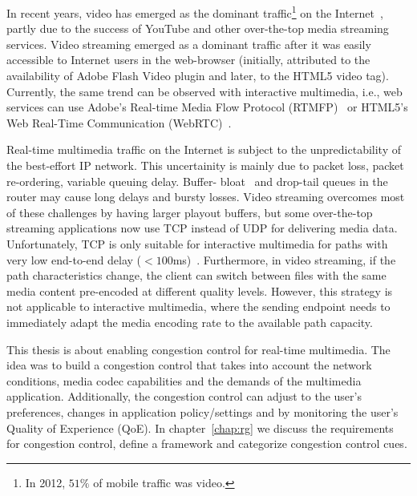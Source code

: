 In recent years, video has emerged as the dominant traffic\footnote{In 2012,
$51\%$ of mobile traffic was video.} on the Internet~\cite{cvni.13,dawn.zb},
partly due to the success of YouTube and other over-the-top media streaming
services. Video streaming emerged as a dominant traffic after it was easily
accessible to Internet users in the web-browser (initially, attributed to the
availability of Adobe Flash Video plugin and later, to the HTML5 video tag).
Currently, the same trend can be observed with interactive multimedia, i.e.,
web services can use Adobe's Real-time Media Flow Protocol
(RTMFP)~\cite{draft.rtmfp} or HTML5's Web Real-Time Communication
(WebRTC)~\cite{draft.webrtc}.

Real-time multimedia traffic on the Internet is subject to the
unpredictability of the best-effort IP network. This uncertainity is mainly
due to packet loss, packet re-ordering, variable queuing delay. Buffer-
bloat~\cite{gettys:bufferbloat} and drop-tail queues in the router may cause
long delays and bursty losses. Video streaming overcomes most of these
challenges by having larger playout buffers, but some over-the-top streaming
applications now use TCP instead of UDP for delivering media data.
Unfortunately, TCP is only suitable for interactive multimedia for paths with
very low end-to-end delay ($<100$ms)~\cite{Brosh:tcp-real-time}. Furthermore,
in video streaming, if the path characteristics change, the client can switch
between files with the same media content pre-encoded at different quality
levels. However, this strategy is not applicable to interactive multimedia,
where the sending endpoint needs to immediately adapt the media encoding rate
to the available path capacity.


This thesis is about enabling congestion control for real-time multimedia. The
idea was to build a congestion control that takes into account the network
conditions, media codec capabilities and the demands of the multimedia
application. Additionally, the congestion control can adjust to the user's
preferences, changes in application policy/settings and by monitoring the
user's Quality of Experience (QoE). In chapter~\ref{chap:rg} we discuss the
requirements for congestion control, define a framework and categorize
congestion control cues.



